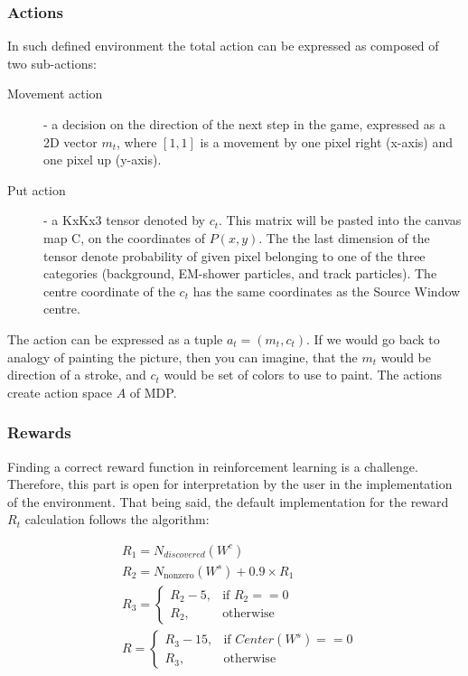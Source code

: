 \subsubsection{Actions}
\label{sec:rl_action}

In such defined environment the total action can be expressed as composed of two sub-actions:

\begin{description}
\item[Movement action] - a decision on the direction of the next step in the game, expressed as a 2D vector $m_{t}$, where $[1,1]$ is a movement by one pixel right (x-axis) and one pixel up (y-axis).

\item[Put action] - a KxKx3 tensor denoted by $c_{t}$. This matrix will be pasted into the canvas map C, on the coordinates of $P(x,y)$.
The the last dimension of the tensor denote probability of given pixel belonging to one of the three categories (background, EM-shower particles, and track particles).
The centre coordinate of the $c_{t}$ has the same coordinates as the Source Window centre.


\end{description}

The action can be expressed as a tuple $a_{t} = (m_{t}, c_{t})$.
If we would go back to analogy of painting the picture, then you can imagine, that the $m_{t}$ would be direction of a stroke, and $c_{t}$ would be set of colors to use to paint. 
The actions create action space $A$ of MDP.

\subsubsection{Rewards}

Finding a correct reward function in reinforcement learning is a challenge.
Therefore, this part is open for interpretation by the user in the implementation of the environment.
That being said, the default implementation for the reward $R_{t}$ calculation follows the algorithm:

\begin{align}
& R_{1} = N_{discovered}(W^{c}) \\
& R_{2}= N_{\mathrm{nonzero}}(W^{s}) + 0.9 \times R_{1}\\
& R_{3} =
\begin{cases}
    R_{2}-5,& \text{if } R_{2}== 0\\
    R_{2},              & \text{otherwise}
\end{cases} \\
& R =
\begin{cases}
    R_{3}-15,& \text{if } Center(W^{s}) == 0\\
    R_{3},              & \text{otherwise}
\end{cases}
\label{eq:reward}
\end{align}

